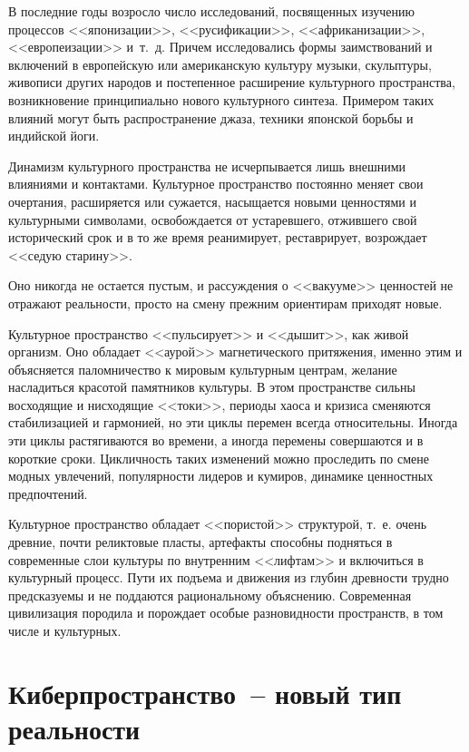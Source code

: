   В последние годы возросло число исследований, посвященных изучению процессов
  <<японизации>>, <<русификации>>, <<африканизации>>, <<европеизации>> и~т.~д.
  Причем исследовались формы заимствований и включений в европейскую или
  американскую культуру музыки, скульптуры, живописи других народов и
  постепенное расширение культурного пространства, возникновение принципиально
  нового культурного синтеза. Примером таких влияний могут быть распространение
  джаза, техники японской борьбы и индийской йоги.
  
  Динамизм культурного пространства не исчерпывается лишь внешними влияниями и
  контактами. Культурное пространство постоянно меняет свои очертания,
  расширяется или сужается, насыщается новыми ценностями и культурными
  символами, освобождается от устаревшего, отжившего свой исторический срок и в
  то же время реанимирует, реставрирует, возрождает <<седую старину>>.
  
  Оно никогда не остается пустым, и рассуждения о <<вакууме>> ценностей не
  отражают реальности, просто на смену прежним ориентирам приходят новые.
  
  Культурное пространство <<пульсирует>> и <<дышит>>, как живой организм. Оно
  обладает <<аурой>> магнетического притяжения, именно этим и объясняется
  паломничество к мировым культурным центрам, желание насладиться красотой
  памятников культуры. В этом пространстве сильны восходящие и нисходящие
  <<токи>>, периоды хаоса и кризиса сменяются стабилизацией и гармонией, но эти
  циклы перемен всегда относительны. Иногда эти циклы растягиваются во времени,
  а иногда перемены совершаются и в короткие сроки. Цикличность таких изменений
  можно проследить по смене модных увлечений, популярности лидеров и кумиров,
  динамике ценностных предпочтений.
  
  Культурное пространство обладает <<пористой>> структурой, т.~е. очень
  древние, почти реликтовые пласты, артефакты способны подняться в современные
  слои культуры по внутренним <<лифтам>> и включиться в культурный процесс.
  Пути их подъема и движения из глубин древности трудно предсказуемы и не
  поддаются рациональному объяснению. Современная цивилизация породила и
  порождает особые разновидности пространств, в том числе и культурных.

  \section{Киберпространство~-- новый тип реальности}
  
